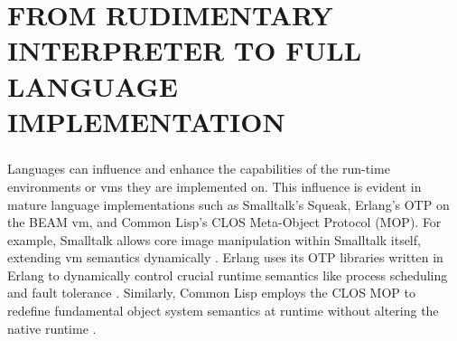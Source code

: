 \chapter[\texorpdfstring{FROM RUDIMENTARY INTERPRETER TO FULL LANGUAGE IMPLEMENTATION}
                          {4. Pycket as Full Racket}]{FROM RUDIMENTARY INTERPRETER TO FULL LANGUAGE IMPLEMENTATION}
	\label{chapter:pycket}












	\paragraph{}%
		Languages can influence and enhance the capabilities of the run-time environments or \glspl{vm} they are implemented on. This influence is evident in mature language implementations such as Smalltalk's Squeak, Erlang's OTP on the BEAM \gls{vm}, and Common Lisp's CLOS Meta-Object Protocol (MOP). For example, Smalltalk allows core image manipulation within Smalltalk itself, extending \gls{vm} semantics dynamically \cite{squeak_smalltalk_vm}. Erlang uses its OTP libraries written in Erlang to dynamically control crucial runtime semantics like process scheduling and fault tolerance \cite{erlang_otp_hpc}. Similarly, Common Lisp employs the CLOS MOP to redefine fundamental object system semantics at runtime without altering the native runtime \cite{clos_overview_mop}.

